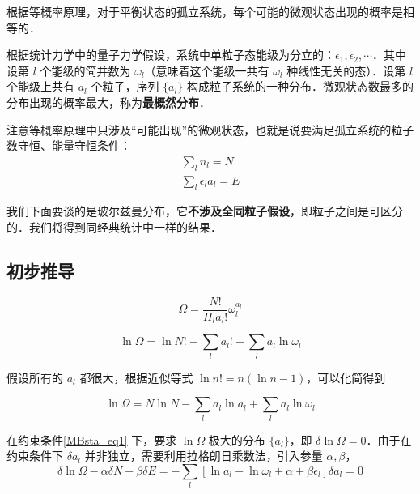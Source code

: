 

根据等概率原理，对于平衡状态的孤立系统，每个可能的微观状态出现的概率是相等的．

根据统计力学中的量子力学假设，系统中单粒子态能级为分立的：$\epsilon_1,\epsilon_2,\cdots$．其中设第 $l$ 个能级的简并数为 $\omega_l$（意味着这个能级一共有 $\omega_l$ 种线性无关的态）．设第 $l$ 个能级上共有 $a_l$ 个粒子，序列 $\{a_l\}$ 构成粒子系统的一种分布．微观状态数最多的分布出现的概率最大，称为\textbf{最概然分布}．

注意等概率原理中只涉及“可能出现”的微观状态，也就是说要满足孤立系统的粒子数守恒、能量守恒条件：
\begin{equation}\label{MBsta_eq1}
\begin{aligned}
\sum_l n_l=N\\
\sum_l \epsilon_l a_l=E
\end{aligned}
\end{equation}

我们下面要谈的是玻尔兹曼分布，它\textbf{不涉及全同粒子假设}，即粒子之间是可区分的．我们将得到同经典统计中一样的结果．

\subsection{初步推导}
\begin{equation}
\Omega=\frac{N!}{\Pi_l a_l!}\omega_l^{a_l}
\end{equation}

\begin{equation}
\ln \Omega=\ln N!-\sum_{l}a_l!+\sum_l a_l\ln \omega_l
\end{equation}

假设所有的 $a_l$ 都很大，根据近似等式 $\ln n! = n(\ln n-1)$，可以化简得到

\begin{equation}
\ln \Omega=N\ln N-\sum_l a_l\ln a_l+\sum_l a_l\ln \omega_l
\end{equation}

在约束条件\autoref{MBsta_eq1} 下，要求 $\ln \Omega$ 极大的分布 $\{a_l\}$，即 $\delta \ln \Omega =0$．由于在约束条件下 $\delta a_l$ 并非独立，需要利用拉格朗日乘数法，引入参量 $\alpha,\beta$，
\begin{equation}
\delta \ln \Omega -\alpha \delta N-\beta \delta E=-\sum_l [\ln a_l-\ln \omega_l+\alpha +\beta\epsilon_l]\delta a_l=0
\end{equation}

